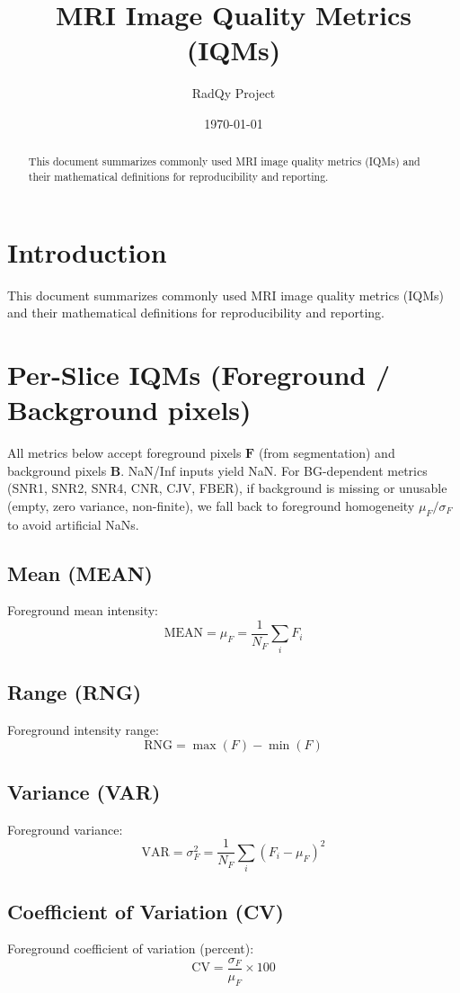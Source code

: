 \documentclass[11pt]{article}
\title{MRI Image Quality Metrics (IQMs)}
\author{RadQy Project}
\date{\today}
\begin{document}
\maketitle

\begin{abstract}
This document summarizes commonly used MRI image quality metrics (IQMs) and their mathematical definitions for reproducibility and reporting.
\end{abstract}
\tableofcontents
\bigskip

\section*{Introduction}
This document summarizes commonly used MRI image quality metrics (IQMs) and their mathematical definitions for reproducibility and reporting.

\section{Per-Slice IQMs (Foreground / Background pixels)}
All metrics below accept foreground pixels $\mathbf{F}$ (from segmentation) and background pixels $\mathbf{B}$. NaN/Inf inputs yield NaN. For BG-dependent metrics (SNR1, SNR2, SNR4, CNR, CJV, FBER), if background is missing or unusable (empty, zero variance, non-finite), we fall back to foreground homogeneity $\mu_F/\sigma_F$ to avoid artificial NaNs.

\subsection{Mean (MEAN)}
Foreground mean intensity:
\[
\text{MEAN} = \mu_F = \frac{1}{N_F} \sum_{i} F_i
\]

\subsection{Range (RNG)}
Foreground intensity range:
\[
\text{RNG} = \max(F) - \min(F)
\]

\subsection{Variance (VAR)}
Foreground variance:
\[
\text{VAR} = \sigma_F^2 = \frac{1}{N_F}\sum_i (F_i - \mu_F)^2
\]

\subsection{Coefficient of Variation (CV)}
Foreground coefficient of variation (percent):
\[
\text{CV} = \frac{\sigma_F}{\mu_F} \times 100
\]
\end{document}
